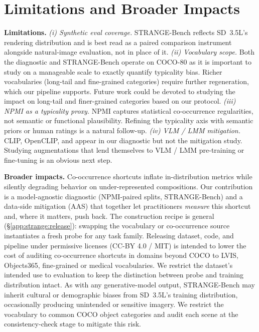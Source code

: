 \section{Limitations and Broader Impacts}
\label{app:discussion}

\noindent\textbf{Limitations.}
\emph{(i) Synthetic eval coverage.} STRANGE-Bench reflects SD~3.5L's rendering distribution and is best read as a paired comparison instrument alongside natural-image evaluation, not in place of it.
\emph{(ii) Vocabulary scope.} Both the diagnostic and STRANGE-Bench operate on COCO-$80$ as it is important to study on a manageable scale to exactly quantify typicality bias. Richer vocabularies (long-tail and fine-grained categories) require further regeneration, which our pipeline supports. 
Future work could be devoted to studying the impact on long-tail and finer-grained categories based on our protocol.
\emph{(iii) NPMI as a typicality proxy.} NPMI captures statistical co-occurrence regularities, not semantic or functional plausibility. Refining the typicality axis with semantic priors or human ratings is a natural follow-up. 
\emph{(iv) VLM / LMM mitigation.} CLIP, OpenCLIP, and \llava{}
appear in our diagnostic but not the mitigation study. Studying augmentations that lend themselves to VLM / LMM pre-training or fine-tuning is an obvious next step.

\noindent\textbf{Broader impacts.} Co-occurrence shortcuts inflate in-distribution metrics while silently degrading behavior on under-represented compositions. Our contribution is a model-agnostic diagnostic (NPMI-paired splits, STRANGE-Bench) and a data-side mitigation (AAS) that together let practitioners \emph{measure} this shortcut and, where it matters, push back. The construction recipe is general (\S\ref{app:strange:release}): swapping the vocabulary or co-occurrence source instantiates a fresh probe for any task family. Releasing dataset, code, and pipeline under permissive licenses (CC-BY 4.0 / MIT) is intended to lower the cost of auditing co-occurrence shortcuts in domains beyond COCO to LVIS, Objects365, fine-grained or medical vocabularies. We restrict the dataset's intended use to evaluation to keep the distinction between probe and training distribution intact.
As with any generative-model output, STRANGE-Bench may inherit cultural or demographic biases from SD~3.5L's training distribution, occasionally producing unintended or sensitive imagery. We restrict the vocabulary to common COCO object categories and audit each scene at the consistency-check stage to mitigate this risk.
